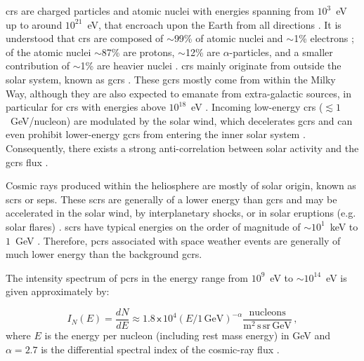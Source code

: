 \glspl{cr} are charged particles and atomic nuclei with energies spanning from $10^{3}$~eV up to around $10^{21}$~eV, that encroach upon the Earth from all directions \citep{giacalone_energetic_2010}. It is understood that \glspl{cr} are composed of $\sim$99\% of atomic nuclei and $\sim$1\% electrons \citep{gaisser_cosmic_2016}; of the atomic nuclei $\sim$87\% are protons, $\sim$12\% are $\alpha$-particles, and a smaller contribution of $\sim$1\% are heavier nuclei \citep{grupen_astroparticle_2005, dunai_cosmic_2010, particle_data_group_review_2020}. \glspl{cr} mainly originate from outside the solar system, known as \glspl{gcr} \citep{particle_data_group_review_2020}. These \glspl{gcr} mostly come from within the Milky Way, although they are also expected to emanate from extra-galactic sources, in particular for \glspl{cr} with energies above $10^{18}$~eV \citep{aab_observation_2017}. Incoming low-energy \glspl{cr} ($\lesssim1$~GeV/nucleon) are modulated by the solar wind, which decelerates \glspl{gcr} and can even prohibit lower-energy \glspl{gcr} from entering the inner solar system \citep{grupen_astroparticle_2005}. Consequently, there exists a strong anti-correlation between solar activity and the \glspl{gcr} flux \citep{particle_data_group_review_2020}.

Cosmic rays produced within the heliosphere are mostly of solar origin, known as \glspl{scr} or \glspl{sep}. These \glspl{scr} are generally of a lower energy than \glspl{gcr} and may be accelerated in the solar wind, by interplanetary shocks, or in solar eruptions (e.g. solar flares) \citep{giacalone_energetic_2010}. \glspl{scr} have typical energies on the order of magnitude of $\sim$$10^{1}$~keV to $1$~GeV \citep{chilingarian_galactic_2003, bruno_solar_2018}. Therefore, \glspl{pcr} associated with space weather events are generally of much lower energy than the background \glspl{gcr}.

The intensity spectrum of \glspl{pcr} in the energy range from $10^9$~eV to $\sim$$10^{14}$~eV is given approximately by:

\begin{equation}
\label{eq:CR_flux}
I_N(E) = \frac{dN}{dE} \approx 1.8 \, \mathsf{x} \, 10^4 (E/1 \, \mathrm{GeV})^{-\alpha} \frac{\mathrm{nucleons}}{{\mathrm{m^2 \, s  \, sr \, GeV}}} \, ,
\end{equation}
%
where $E$ is the energy per nucleon (including rest mass energy) in GeV and $\alpha=2.7$ is the differential spectral index of the cosmic-ray flux \citep{particle_data_group_review_2020}. 

